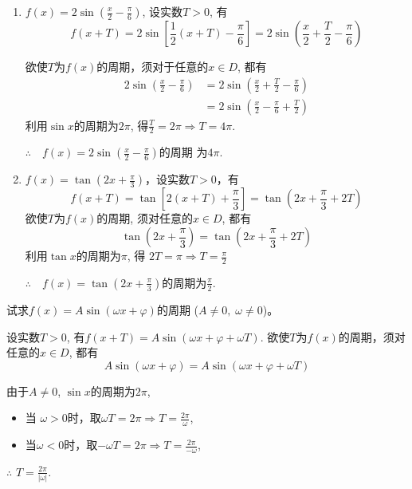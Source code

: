 \begin{solution}
\begin{enumerate}[(1)]
    \item $f(x)=2\sin\left(\frac{x}{2}-\frac{\pi}{6}\right)$, 设实数$T>0$, 有
\[f(x+T)=2\sin\left[\frac{1}{2}(x+T)-\frac{\pi}{6}\right]=2\sin\left(\frac{x}{2}+\frac{T}{2}-\frac{\pi}{6}\right)\]

欲使$T$为$f(x)$的周期，须对于任意的$x\in D$, 都有
\begin{equation}
\begin{split}
    2\sin\left(\frac{x}{2}-\frac{\pi}{6}\right)&=2\sin\left(\frac{x}{2}+\frac{T}{2}-\frac{\pi}{6}\right)\\
    &=2\sin\left(\frac{x}{2}-\frac{\pi}{6}+\frac{T}{2}\right)
\end{split}\tag{*}
\end{equation}
利用$\sin x$的周期为$2\pi$, 得$\frac T2= 2\pi \Rightarrow T= 4\pi$.

$\therefore\quad f(x)=2\sin\left(\frac{x}{2}-\frac{\pi}{6}\right)$的周期 为$4\pi$.

\item $f(x)=\tan\left(2x+\frac{\pi}{3}\right)$，设实数$T>0$，有
\[f(x+T)=\tan\left[2(x+T)+\frac{\pi}{3}\right]=\tan\left(2x+\frac{\pi}{3}+2T\right)\]
欲使$T$为$f(x)$的周期, 须对任意的$x\in D$, 都有
\[\tan\left(2x+\frac{\pi}{3}\right)=\tan\left(2x+\frac{\pi}{3}+2T\right)\]
利用$\tan x$的周期为$\pi$, 得 $2T=\pi \Rightarrow T=\frac{\pi}{2}$

$\therefore\quad f(x)=\tan\left(2x+\frac{\pi}{3}\right)$的周期为$\frac{\pi}{2}$.

\end{enumerate}
\end{solution}

\begin{example}
试求$f(x)=A\sin(\omega x+\varphi)$的周期 ($A\neq0,\; \omega\neq0$)。
\end{example}

\begin{solution}
设实数$T>0$, 有$f(x+T)=A\sin\left(\omega x+\varphi+\omega T\right)$.
欲使$T$为$f(x)$的周期，须对任意的$x\in D$, 都有
$$A\sin\left(\omega x+\varphi\right)=A\sin\left(\omega x+\varphi+\omega T\right)$$

由于$A\neq0$, $\sin x$的周期为$2\pi$,
\begin{itemize}
\item 当 $\omega>0$时，取$\omega T=2\pi\Rightarrow T=\frac{2\pi}\omega$,
\item 当$\omega<0$时，取$-\omega T=2\pi\Rightarrow T=\frac{2\pi}{-\omega}$,
\end{itemize}

$\therefore$ $T= \frac {2\pi }{| \omega | }$.
\end{solution}
    
